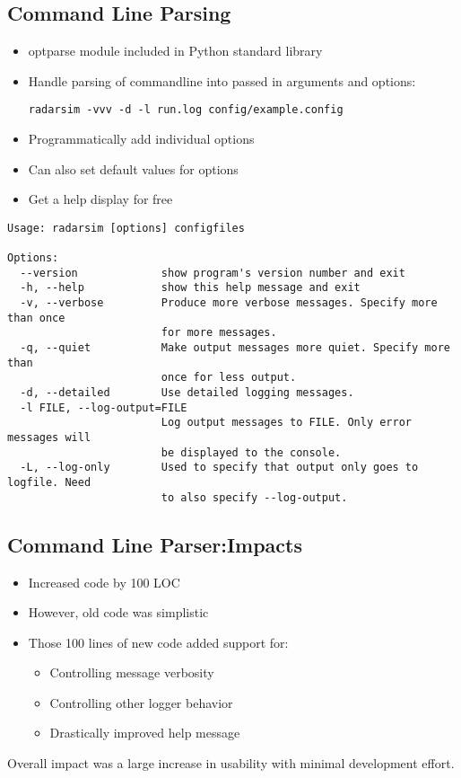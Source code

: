 \documentclass[twocolumn]{article}
\begin{document}
\subsection{Command Line Parsing}
  \lstset{language=Python}
  \begin{itemize}
    \item optparse module included in Python standard library
    \item Handle parsing of commandline into passed in arguments and options:

    {\scriptsize\verb$radarsim -vvv -d -l run.log config/example.config$}
    \item Programmatically add individual options
    
    \item Can also set default values for options
    \item Get a help display for free
  \end{itemize}


{\tiny
\begin{verbatim}
Usage: radarsim [options] configfiles

Options:
  --version             show program's version number and exit
  -h, --help            show this help message and exit
  -v, --verbose         Produce more verbose messages. Specify more than once
                        for more messages.
  -q, --quiet           Make output messages more quiet. Specify more than
                        once for less output.
  -d, --detailed        Use detailed logging messages.
  -l FILE, --log-output=FILE
                        Log output messages to FILE. Only error messages will
                        be displayed to the console.
  -L, --log-only        Used to specify that output only goes to logfile. Need
                        to also specify --log-output.
\end{verbatim}}

\subsection{Command Line Parser:Impacts}
  \begin{itemize}
    \item Increased code by 100 LOC
    \item However, old code was simplistic
    \item Those 100 lines of new code added support for:
    \begin{itemize}
      \item Controlling message verbosity
      \item Controlling other logger behavior
      \item Drastically improved help message
    \end{itemize}
  \end{itemize}
  Overall impact was a large increase in usability with minimal development effort.
\end{document}
